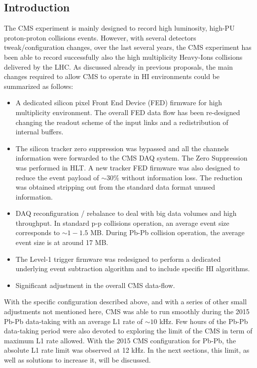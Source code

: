 \subsection{Introduction\label{subsec:HWintro}}
The CMS experiment is mainly designed to record high luminosity, high-PU proton-proton collisions events.  However, with several detectors tweak/configuration changes, over the last several years, the CMS experiment has been able to record successfully also the high multiplicity Heavy-Ions collisions delivered by the LHC. As discussed already in previous
proposals, the main changes required to allow CMS to operate in HI environments could be summarized as follows:

\begin{itemize}
\item A dedicated silicon pixel Front End Device (FED) firmware for high multiplicity environment. The overall FED data flow has been re-designed changing the readout scheme of the input links and a redistribution of internal buffers.
 
\item The silicon tracker zero suppression was bypassed and all the channels information were forwarded to the CMS DAQ system. The Zero Suppression was performed in HLT. A new tracker FED firmware was also designed to reduce the event payload of $\sim 30 \%$ without information loss. The reduction was obtained stripping out from the standard data format unused information.  

\item DAQ reconfiguration / rebalance to deal with big data volumes and high throughput. In standard p-p collisions operation, an average event size corresponds to $\sim 1-1.5$ MB. During Pb-Pb collision operation, the average event size is at around 17 MB. 

\item The Level-1 trigger firmware was redesigned to perform a dedicated underlying event subtraction algorithm and to include specific HI algorithms.

\item Significant adjustment in the overall CMS data-flow.
\end{itemize}


With the specific configuration described above, and with a series of other small adjustments not mentioned here, CMS was able to run smoothly during the 2015 Pb-Pb data-taking with an average L1 rate of $\sim 10$ kHz. Few hours of the Pb-Pb data-taking
period were also devoted to exploring the limit of the CMS in term of maximum L1 rate allowed.  With the 2015 CMS configuration for Pb-Pb, the absolute L1 rate limit was observed at 12 kHz. In the next sections, this limit, as well as solutions to increase it, will be discussed. 

